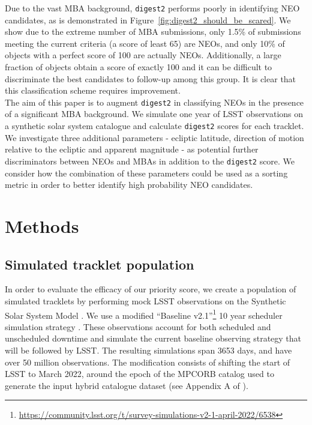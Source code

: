 \documentclass[twocolumn, twocolappendix]{aastex631}
\newcommand{\dig}{\texttt{digest2}}
\begin{document}
Due to the vast MBA background, \dig{} performs poorly in identifying NEO candidates, as is demonstrated in Figure~\ref{fig:digest2_should_be_scared}. We show due to the extreme number of MBA submissions, only 1.5\% of submissions meeting the current criteria (a score of least 65) are NEOs, and only 10\% of objects with a perfect score of 100 are actually NEOs. Additionally, a large fraction of objects obtain a score of exactly 100 and it can be difficult to discriminate the best candidates to follow-up among this group. It is clear that this classification scheme requires improvement.
\\

The aim of this paper is to augment \dig{} in classifying NEOs in the presence of a significant MBA background. We simulate one year of LSST observations on a synthetic solar system catalogue and calculate \dig{} scores for each tracklet. We investigate three additional parameters - ecliptic latitude, direction of motion relative to the ecliptic and apparent magnitude - as potential further discriminators between NEOs and MBAs in addition to the \dig{} score. We consider how the combination of these parameters could be used as a sorting metric in order to better identify high probability NEO candidates.

\section{Methods}

\subsection{Simulated tracklet population}

In order to evaluate the efficacy of our priority score, we create a population of simulated tracklets by performing mock LSST observations on the Synthetic Solar System Model \citep{Grav+2011}. We use a modified ``Baseline v2.1''\footnote{\url{https://community.lsst.org/t/survey-simulations-v2-1-april-2022/6538}} 10 year scheduler simulation strategy \citep{Naghib+2019, Cornwall+2020}. These observations account for both scheduled and unscheduled downtime and simulate the current baseline observing strategy that will be followed by LSST. The resulting simulations span 3653 days, and have over 50 million observations. The modification consists of shifting the start of LSST to March 2022, around the epoch of the MPCORB catalog used to generate the input hybrid catalogue dataset (see Appendix A of \citealp{sky-is-falling}).
\end{document}
